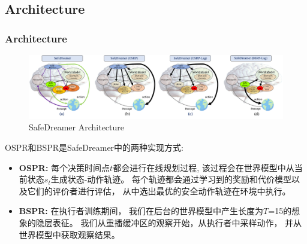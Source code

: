 \documentclass[10pt,mathserif]{beamer}%
\begin{document}
\subsection{Architecture}
\begin{frame}[t, fragile]
	\frametitle{Architecture}
	\begin{figure}
		\centering
		\includegraphics[width=0.9\linewidth]{./images/brain.pdf}
		\caption{SafeDreamer Architecture}
		\label{Fig:net}
	\end{figure}
	\begin{spacing}{1.5}
		OSPR和BSPR是SafeDreamer中的两种实现方式:
		{
		\fontsize{10}\selectfont
		\begin{itemize}
			\item\textbf{OSPR:} 每个决策时间点$t$都会进行在线规划过程,
			该过程会在世界模型中从当前状态$s_{t}$生成状态-动作轨迹。
			每个轨迹都会通过学习到的奖励和代价模型以及它们的评价者进行评估，
			从中选出最优的安全动作轨迹在环境中执行。
			\item\textbf{BSPR:} 在执行者训练期间，
			我们在后台的世界模型中产生长度为$T$=15的想象的隐层表征。
			我们从重播缓冲区的观察开始，从执行者中采样动作，
			并从世界模型中获取观察结果。
		\end{itemize}
		}	
	\end{spacing}
\end{frame}
\end{document}
